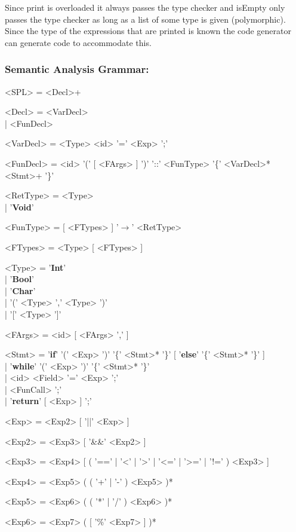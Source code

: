 \documentclass{article}
\begin{document}
Since print is overloaded it always passes the type checker and isEmpty only passes the type checker as long as a list of some type is given (polymorphic). Since the type of the expressions that are printed is known the code generator can generate code to accommodate this.

\subsubsection*{Semantic Analysis Grammar:}
\begin{grammar}
	<SPL> = <Decl>+

	<Decl> = <VarDecl> \\| <FunDecl>

	<VarDecl> = <Type> <id> '=' <Exp> ';'

	<FunDecl> = <id> '(' [ <FArgs> ] ')' '::' <FunType> '\{' <VarDecl>* <Stmt>+ '\}'

	<RetType> = <Type> \\| '\textbf{Void}'

	<FunType> = [ <FTypes> ] '$\rightarrow$' <RetType>

	<FTypes> = <Type> [ <FTypes> ]

	<Type> = '\textbf{Int}' \\| '\textbf{Bool}' \\| '\textbf{Char}' \\| '(' <Type> ',' <Type> ')' \\| '[' <Type> ']'

	<FArgs> = <id> [ <FArgs> ',' ]

	<Stmt> = '\textbf{if}' '(' <Exp> ')' '\{' <Stmt>* '\}' [ '\textbf{else}' '\{' <Stmt>* '\}' ] \\| '\textbf{while}' '(' <Exp> ')' '\{' <Stmt>* '\}' \\| <id> <Field> '=' <Exp> ';' \\| <FunCall> ';' \\| '\textbf{return}' [ <Exp> ] ';'

	<Exp> = <Exp2> [ '||' <Exp> ]

	<Exp2> = <Exp3> [ '\&\&' <Exp2> ]

	<Exp3> = <Exp4> [ ( '==' | '\textless' | '\textgreater' | '\textless=' | '\textgreater=' | '!=' ) <Exp3> ]

	<Exp4> = <Exp5> ( ( '+' | '-' ) <Exp5> )*

	<Exp5> = <Exp6> ( ( '*' | '/' ) <Exp6> )*

	<Exp6> = <Exp7> ( [ '\%' <Exp7> ] )*


\end{grammar}
\end{document}

